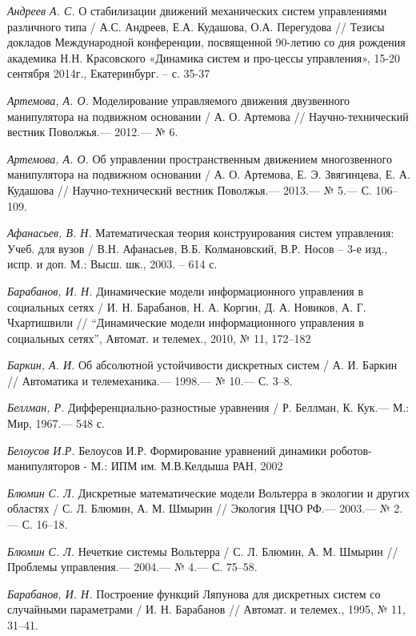 \begin{thebibliography}{10}
	{\it Андреев А. С.} О стабилизации движений механических систем управлениями различного типа / А.С. Андреев, Е.А. Кудашова, О.А. Перегудова // Тезисы докладов Международной конференции, посвященной 90-летию со дня рождения академика Н.Н. Красовского «Динамика систем и про-цессы управления», 15-20 сентября 2014г., Екатеринбург. – с. 35-37

	
	{\it Артемова, А. О.} Моделирование управляемого движения двузвенного манипулятора на подвижном основании /
	А. О. Артемова // Научно-технический вестник Поволжья.— 2012.— № 6.
	
	{\it Артемова, А. О.} Об управлении пространственным движением многозвенного манипулятора на подвижном основании /
	А. О. Артемова, Е. Э. Звягинцева, Е. А. Кудашова // Научно-технический вестник Поволжья.— 2013.— № 5.— С. 106–109.
	
	{\it Афанасьев, В. Н.} Математическая теория конструирования систем управления: Учеб. для вузов / В.Н. Афанасьев, В.Б. Колмановский, В.Р. Носов – 3-е изд., испр. и доп. М.: Высш. шк., 2003. – 614 с.

	{\it Барабанов, И. Н.} Динамические модели информационного управления в социальных сетях / И. Н. Барабанов, Н. А. Коргин, Д. А. Новиков, А. Г. Чхартишвили // “Динамические модели информационного управления в социальных сетях”, Автомат. и телемех., 2010, № 11, 172–182
	
	
	{\it Баркин, А. И.} Об абсолютной устойчивости дискретных систем / А. И. Баркин // Автоматика и телемеханика.— 1998.— № 10.— С. 3–8.
	
	{\it Беллман, Р.} Дифференциально-разностные уравнения / Р. Беллман, К. Кук.— М.: Мир,
	1967.— 548 с.
	
	{\it Белоусов И.Р.} Белоусов И.Р. Формирование уравнений динамики роботов-  манипуляторов - М.: ИПМ им. М.В.Келдыша РАН, 2002
	
	{\it Блюмин С. Л.} Дискретные математические модели Вольтерра в экологии и других областях /
	С. Л. Блюмин, А. М. Шмырин // Экология ЦЧО РФ.— 2003.— № 2.—
	С. 16–18.
	
	{\it Блюмин С. Л.} Нечеткие системы Вольтерра /
	С. Л. Блюмин, А. М. Шмырин // Проблемы управления.— 2004.— № 4.—
	С. 75–58.
	
	{\it Барабанов, И. Н.} Построение функций Ляпунова для дискретных систем со случайными параметрами / И. Н. Барабанов // Автомат. и телемех., 1995, № 11, 31–41.
	

\end{thebibliography}
